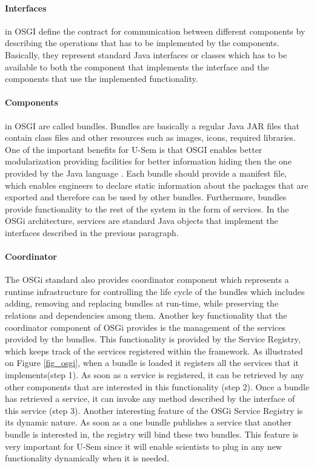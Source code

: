 \paragraph{Interfaces}
 in OSGI define the contract for communication between different components by describing the operations that has to be implemented by the components. Basically, they represent standard Java interfaces or classes which has to be available to both the component that implements the interface and the components that use the implemented functionality.


\paragraph{Components}
  in OSGI are called bundles. Bundles are basically a regular Java JAR files that contain class files and other resources such as images, icons, required libraries. One of the important benefits for U-Sem is that OSGI enables better modularization providing facilities for better information hiding then the one provided by the Java language \cite{tavares2008gentle}. Each bundle should provide a manifest file, which enables engineers to declare static information about the packages that are exported and therefore can be used by other bundles. Furthermore, bundles provide functionality to the rest of the system in the form of services. In the OSGi architecture, services are standard Java objects that implement the interfaces described in the previous paragraph.

\paragraph{Coordinator}
The OSGi standard also provides coordinator component which represents a runtime infrastructure for controlling the life cycle of the bundles which includes adding, removing and replacing bundles at run-time, while preserving the relations and dependencies among them. Another key functionality that the coordinator component of OSGi provides is the management of the services provided by the bundles. This functionality is provided by the Service Registry, which keeps track of the services registered within the framework. As illustrated on Figure \ref{fig_osgi}, when a bundle is loaded it registers all the services that it implements(step 1). As soon as a service is registered, it can be retrieved by any other components that are interested in this functionality (step 2). Once a bundle has retrieved a service, it can invoke any method described by the interface of this service (step 3). Another interesting feature of the OSGi Service Registry is its dynamic nature. As soon as a one bundle publishes a service that another bundle is interested in, the registry will bind these two bundles. This feature is very important for U-Sem since it will enable scientists to plug in any new functionality dynamically when it is needed.

